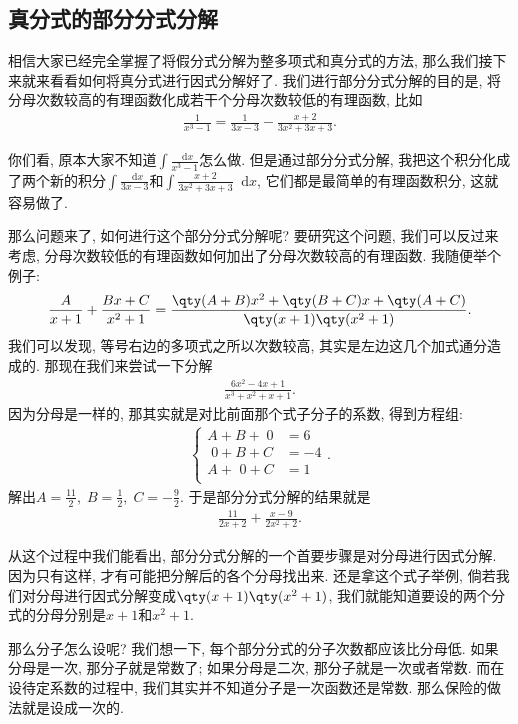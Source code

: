\documentclass{ctexbook}
\newcommand*{\dif}{\mathop{}\!\mathrm{d}}
\begin{document}
{\subsection{真分式的部分分式分解}
相信大家已经完全掌握了将假分式分解为整多项式和真分式的方法, 那么我们接下来就来看看如何将真分式进行因式分解好了. 我们进行部分分式分解的目的是, 将分母次数较高的有理函数化成若干个分母次数较低的有理函数, 比如
\begin{align*}
\frac{1}{x^{3}-1}=\frac{1}{3x-3}-\frac{x+2}{3x^{2}+3x+3}
.\end{align*}\par
你们看, 原本大家不知道$\int\frac{\dif{x}}{x^{3}-1}$怎么做. 但是通过部分分式分解, 我把这个积分化成了两个新的积分$\int\frac{\dif{x}}{3x-3}$和$\int\frac{x+2}{3x^{2}+3x+3}\dif{x}$, 它们都是最简单的有理函数积分, 这就容易做了. \par
那么问题来了, 如何进行这个部分分式分解呢? 要研究这个问题, 我们可以反过来考虑, 分母次数较低的有理函数如何加出了分母次数较高的有理函数. 我随便举个例子: 
\begin{align*}
\frac{A}{x+1}+\frac{Bx+C}{x^{2}+1}=\frac{\qty(A+B)x^{2}+\qty(B+C)x+\qty(A+C)}{\qty(x+1)\qty(x^{2}+1)}
.\end{align*}
我们可以发现, 等号右边的多项式之所以次数较高, 其实是左边这几个加式通分造成的. 那现在我们来尝试一下分解
\begin{align*}
\frac{6x^{2}-4x+1}{x^{3}+x^{2}+x+1}
.\end{align*}
因为分母是一样的, 那其实就是对比前面那个式子分子的系数, 得到方程组: 
\begin{align*}
\begin{cases}
A+B+\;0&=6\\
\;0+B+C&=-4\\
A+\,\,0+C&=1\\
\end{cases}
.\end{align*}
解出$A=\frac{11}{2},\;B=\frac{1}{2},\;C=-\frac{9}{2}$. 于是部分分式分解的结果就是
\begin{align*}
\frac{11}{2x+2}+\frac{x-9}{2x^{2}+2}
.\end{align*}\par
从这个过程中我们能看出, 部分分式分解的一个首要步骤是对分母进行因式分解. 因为只有这样, 才有可能把分解后的各个分母找出来. 还是拿这个式子举例, 倘若我们对分母进行因式分解变成$\qty(x+1)\qty(x^{2}+1)$, 我们就能知道要设的两个分式的分母分别是$x+1$和$x^{2}+1$. \par
那么分子怎么设呢? 我们想一下, 每个部分分式的分子次数都应该比分母低. 如果分母是一次, 那分子就是常数了; 如果分母是二次, 那分子就是一次或者常数. 而在设待定系数的过程中, 我们其实并不知道分子是一次函数还是常数. 那么保险的做法就是设成一次的. \par
}
\end{document}

